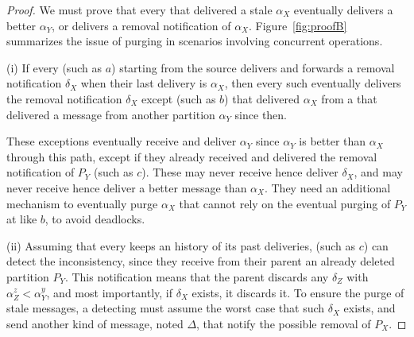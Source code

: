 \begin{proof}
  We must prove that every \process that delivered a stale $\alpha_X$
  eventually delivers a better $\alpha_Y$, or delivers a removal
  notification of $\alpha_X$.  Figure~\ref{fig:proofB} summarizes the
  issue of purging in scenarios involving concurrent operations.
  
  (i) If every \process (such as $a$) starting from the source
  delivers and forwards a removal notification $\delta_X$ when their
  last delivery is $\alpha_X$, then every such \process eventually
  delivers the removal notification $\delta_X$ except \processes (such
  as $b$) that delivered $\alpha_X$ from a \process that delivered a
  message from another partition $\alpha_Y$ since then.
  
  These exceptions eventually receive and deliver $\alpha_Y$ since
  $\alpha_Y$ is better than $\alpha_X$ through this path, except if
  they already received and delivered the removal notification of
  $P_Y$ (such as $c$). These \processes may never receive hence
  deliver $\delta_X$, and may never receive hence deliver a better
  message than $\alpha_X$. They need an additional mechanism to
  eventually purge $\alpha_X$ that cannot rely on the eventual purging
  of $P_Y$ at \processes like $b$, to avoid deadlocks.
  
  (ii) Assuming that every \process keeps an history of its past
  deliveries, \processes (such as $c$) can detect the inconsistency,
  since they receive from their parent an already deleted partition
  $P_Y$. This notification means that the parent discards any
  $\delta_Z$ with $\alpha_Z^z < \alpha_Y^y$, and most importantly, if
  $\delta_X$ exists, it discards it. To ensure the purge of stale
  messages, a detecting \process must assume the worst case that such
  $\delta_X$ exists, and send another kind of message, noted $\Delta$,
  that notify the possible removal of $P_X$.
  

\end{proof}
